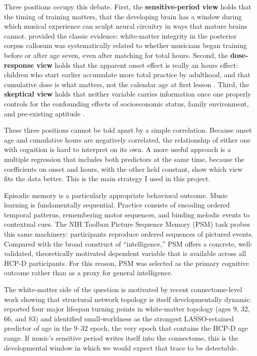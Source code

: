 \documentclass[11pt]{article}
\begin{document}
Three positions occupy this debate. First, the \textbf{sensitive-period view} holds that the timing of training matters, that the developing brain has a window during which musical experience can sculpt neural circuitry in ways that mature brains cannot. \citet{steele2013} provided the classic evidence: white-matter integrity in the posterior corpus callosum was systematically related to whether musicians began training before or after age seven, even after matching for total hours. Second, the \textbf{dose-response view} holds that the apparent onset effect is really an hours effect: children who start earlier accumulate more total practice by adulthood, and that cumulative dose is what matters, not the calendar age at first lesson \citep{schellenberg2020}. Third, the \textbf{skeptical view} holds that neither variable carries information once one properly controls for the confounding effects of socioeconomic status, family environment, and pre-existing aptitude \citep{sala2017}.

These three positions cannot be told apart by a simple correlation. Because onset age and cumulative hours are negatively correlated, the relationship of either one with cognition is hard to interpret on its own. A more useful approach is a multiple regression that includes both predictors at the same time, because the coefficients on onset and hours, with the other held constant, show which view fits the data better. This is the main strategy I used in this project.

Episodic memory is a particularly appropriate behavioral outcome. Music learning is fundamentally sequential. Practice consists of encoding ordered temporal patterns, remembering motor sequences, and binding melodic events to contextual cues. The NIH Toolbox Picture Sequence Memory (PSM) task probes this same machinery: participants reproduce ordered sequences of pictured events. Compared with the broad construct of ``intelligence,'' PSM offers a concrete, well-validated, theoretically motivated dependent variable that is available across all HCP-D participants. For this reason, PSM was selected as the primary cognitive outcome rather than as a proxy for general intelligence.

The white-matter side of the question is motivated by recent connectome-level work showing that structural network topology is itself developmentally dynamic. \citet{mousley2025} reported four major lifespan turning points in white-matter topology (ages 9, 32, 66, and 83) and identified small-worldness as the strongest LASSO-retained predictor of age in the 9--32 epoch, the very epoch that contains the HCP-D age range. If music's sensitive period writes itself into the connectome, this is the developmental window in which we would expect that trace to be detectable.
\end{document}
